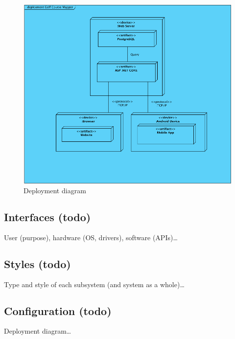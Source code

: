\documentclass{article}
\begin{document}
    \paragraph{}

    \begin{center}
        \begin{figure}[h]
            \centering
            \includegraphics[scale=0.9]{DeploymentDiagram}
            \caption{Deployment diagram}
            \label{deploymentdiagram}
        \end{figure}
    \end{center}

    \subsection{Interfaces (todo)}

    User (purpose), hardware (OS, drivers), software (APIs)\ldots

    \subsection{Styles (todo)}

    Type and style of each subsystem (and system as a whole)\ldots

    \subsection{Configuration (todo)}

    Deployment diagram\ldots
\end{document}
